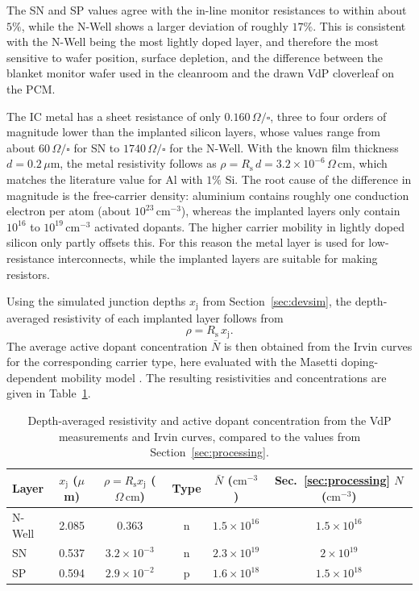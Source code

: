 The SN and SP values agree with the in-line monitor resistances to within about $5\%$, while the N-Well shows a larger deviation of roughly $17\%$. This is consistent with the N-Well being the most lightly doped layer, and therefore the most sensitive to wafer position, surface depletion, and the difference between the blanket monitor wafer used in the cleanroom and the drawn VdP cloverleaf on the PCM.

The IC metal has a sheet resistance of only $0.160\,\Omega/\square$, three to four orders of magnitude lower than the implanted silicon layers, whose values range from about $60\,\Omega/\square$ for SN to $1740\,\Omega/\square$ for the N-Well. With the known film thickness $d = 0.2\,\mu\mathrm{m}$, the metal resistivity follows as $\rho = R_\mathrm{s}\,d = 3.2\times10^{-6}\,\Omega\,\mathrm{cm}$, which matches the literature value for Al with $1\%$ Si. The root cause of the difference in magnitude is the free-carrier density: aluminium contains roughly one conduction electron per atom (about $10^{23}\,\mathrm{cm}^{-3}$), whereas the implanted layers only contain $10^{16}$ to $10^{19}\,\mathrm{cm}^{-3}$ activated dopants. The higher carrier mobility in lightly doped silicon only partly offsets this. For this reason the metal layer is used for low-resistance interconnects, while the implanted layers are suitable for making resistors.

Using the simulated junction depths $x_\mathrm{j}$ from Section~\ref{sec:devsim}, the depth-averaged resistivity of each implanted layer follows from
\begin{equation}
  \rho = R_\mathrm{s}\,x_\mathrm{j}.
  \label{eq:rho-vdp}
\end{equation}
The average active dopant concentration $\bar N$ is then obtained from the Irvin curves for the corresponding carrier type, here evaluated with the Masetti doping-dependent mobility model \cite{masetti1983modeling}. The resulting resistivities and concentrations are given in Table~\ref{tab:ch6-vdp-conc}.

\begin{table}[htbp]
  \centering
  \caption{Depth-averaged resistivity and active dopant concentration from the VdP measurements and Irvin curves, compared to the values from Section~\ref{sec:processing}.}
  \label{tab:ch6-vdp-conc}
  \begin{tabular}{lccccc}
    \toprule
    Layer & $x_\mathrm{j}$ ($\mu$m) & $\rho = R_\mathrm{s}x_\mathrm{j}$ ($\Omega\,\mathrm{cm}$) & Type & $\bar N$ ($\mathrm{cm}^{-3}$) & Sec.~\ref{sec:processing} $N$ ($\mathrm{cm}^{-3}$)\\
    \midrule
    N-Well & 2.085 & 0.363            & n & $1.5\times10^{16}$ & $1.5\times10^{16}$ \\
    SN     & 0.537 & $3.2\times10^{-3}$ & n & $2.3\times10^{19}$ & $2\times10^{19}$ \\
    SP     & 0.594 & $2.9\times10^{-2}$ & p & $1.6\times10^{18}$ & $1.5\times10^{18}$ \\
    \bottomrule
  \end{tabular}
\end{table}

